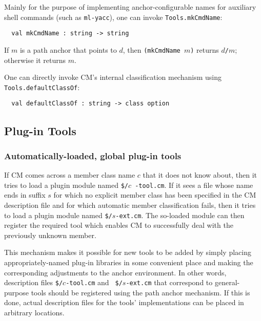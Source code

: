  Mainly for the purpose of
implementing anchor-configurable names for auxiliary shell commands
(such as {\tt ml-yacc}), one can invoke {\tt Tools.mkCmdName}:

\begin{verbatim}
  val mkCmdName : string -> string
\end{verbatim}

If $m$ is a path anchor that points to $d$, then {\tt (mkCmdName $m$)}
returns $d${\tt /}$m$; otherwise it returns $m$.

 One can
directly invoke CM's internal classification mechanism using {\tt
Tools.defaultClassOf}:

\begin{verbatim}
  val defaultClassOf : string -> class option
\end{verbatim}

\subsection{Plug-in Tools}
\label{sec:plugintools}

\subsubsection{Automatically-loaded, global plug-in tools}

If CM comes across a member class name $c$ that it does not know
about, then it tries to load a plugin module named {\tt \$/}$c${\tt
-tool.cm}.  If it sees a file whose name ends in suffix $s$ for which
no explicit member class has been specified in the CM description file
and for which automatic member classification fails, then it tries to
load a plugin module named {\tt \$/}$s${\tt -ext.cm}.  The so-loaded
module can then register the required tool which enables CM to
successfully deal with the previously unknown member.

This mechanism makes it possible for new tools to be added by simply
placing appropriately-named plug-in libraries in some convenient place
and making the corresponding adjustments to the anchor environment.
In other words, description files {\tt \$/}$c${\tt -tool.cm} and {\tt
\$/}$s${\tt -ext.cm} that correspond to general-purpose tools should
be registered using the path anchor mechanism.  If this is done,
actual description files for the tools' implementations can be placed
in arbitrary locations.

